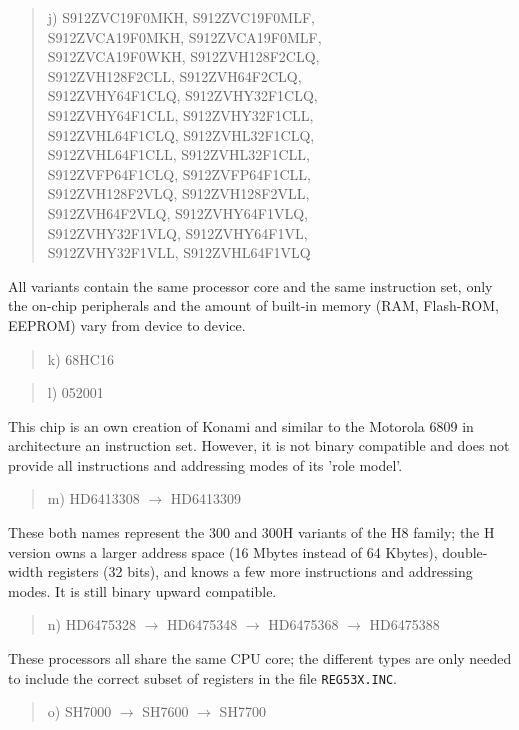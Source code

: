 \documentclass[12pt,twoside]{report}
\newcommand{\tty}[1]{{\tt #1}}
\begin{document}
\begin{quote}
j) S912ZVC19F0MKH, S912ZVC19F0MLF,\\
   S912ZVCA19F0MKH, S912ZVCA19F0MLF,\\
   S912ZVCA19F0WKH, S912ZVH128F2CLQ,\\
   S912ZVH128F2CLL, S912ZVH64F2CLQ,\\
   S912ZVHY64F1CLQ, S912ZVHY32F1CLQ,\\
   S912ZVHY64F1CLL, S912ZVHY32F1CLL,\\
   S912ZVHL64F1CLQ, S912ZVHL32F1CLQ,\\
   S912ZVHL64F1CLL, S912ZVHL32F1CLL,\\
   S912ZVFP64F1CLQ, S912ZVFP64F1CLL,\\
   S912ZVH128F2VLQ, S912ZVH128F2VLL,\\
   S912ZVH64F2VLQ, S912ZVHY64F1VLQ,\\
   S912ZVHY32F1VLQ, S912ZVHY64F1VL,\\
   S912ZVHY32F1VLL, S912ZVHL64F1VLQ 
\end{quote}
All variants contain the same processor core and the same
instruction set, only the on-chip peripherals and the
amount of built-in memory (RAM, Flash-ROM, EEPROM)
vary from device to device.
\begin{quote}
k) 68HC16
\end{quote}
\begin{quote}
l) 052001
\end{quote}
This chip is an own creation of Konami and similar to the
Motorola 6809 in architecture an instruction set.  However,
it is not binary compatible and does not provide all instructions
and addressing modes of its 'role model'.
\begin{quote}
m) HD6413308 $\rightarrow$ HD6413309
\end{quote}
These both names represent the 300 and 300H variants of the H8
family; the H version owns a larger address space (16 Mbytes instead
of 64 Kbytes), double-width registers (32 bits), and knows a few more
instructions and addressing modes.  It is still binary upward
compatible.
\begin{quote}
n) HD6475328 $\rightarrow$ HD6475348 $\rightarrow$ HD6475368 $\rightarrow$ HD6475388
\end{quote}
These processors all share the same CPU core; the different types are
only needed to include the correct subset of registers in the file
\tty{REG53X.INC}.
\begin{quote}
o) SH7000 $\rightarrow$ SH7600 $\longrightarrow$ SH7700
\end{quote}
\end{document}
